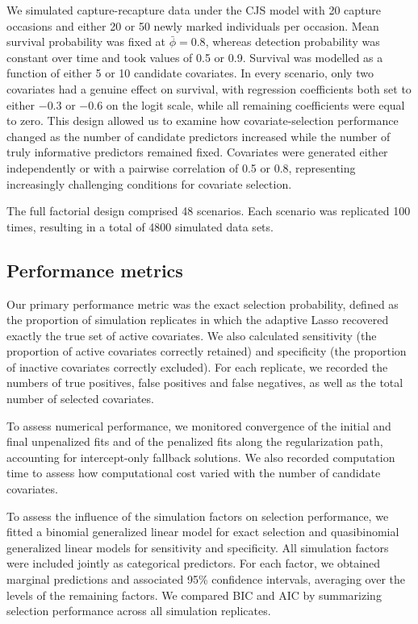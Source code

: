 \documentclass[
  11pt,
  a4paper,
]{article}
\begin{document}
We simulated capture-recapture data under the CJS model with 20 capture occasions and either 20 or 50 newly marked individuals per occasion. Mean survival probability was fixed at \(\bar{\phi}=0.8\), whereas detection probability was constant over time and took values of 0.5 or 0.9. Survival was modelled as a function of either 5 or 10 candidate covariates. In every scenario, only two covariates had a genuine effect on survival, with regression coefficients both set to either \(-0.3\) or \(-0.6\) on the logit scale, while all remaining coefficients were equal to zero. This design allowed us to examine how covariate-selection performance changed as the number of candidate predictors increased while the number of truly informative predictors remained fixed. Covariates were generated either independently or with a pairwise correlation of 0.5 or 0.8, representing increasingly challenging conditions for covariate selection.

The full factorial design comprised 48 scenarios. Each scenario was replicated 100 times, resulting in a total of 4800 simulated data sets.

\subsection{Performance metrics}\label{performance-metrics}

Our primary performance metric was the exact selection probability, defined as the proportion of simulation replicates in which the adaptive Lasso recovered exactly the true set of active covariates. We also calculated sensitivity (the proportion of active covariates correctly retained) and specificity (the proportion of inactive covariates correctly excluded). For each replicate, we recorded the numbers of true positives, false positives and false negatives, as well as the total number of selected covariates.

To assess numerical performance, we monitored convergence of the initial and final unpenalized fits and of the penalized fits along the regularization path, accounting for intercept-only fallback solutions. We also recorded computation time to assess how computational cost varied with the number of candidate covariates.

To assess the influence of the simulation factors on selection performance, we fitted a binomial generalized linear model for exact selection and quasibinomial generalized linear models for sensitivity and specificity. All simulation factors were included jointly as categorical predictors. For each factor, we obtained marginal predictions and associated 95\% confidence intervals, averaging over the levels of the remaining factors. We compared BIC and AIC by summarizing selection performance across all simulation replicates.
\end{document}
